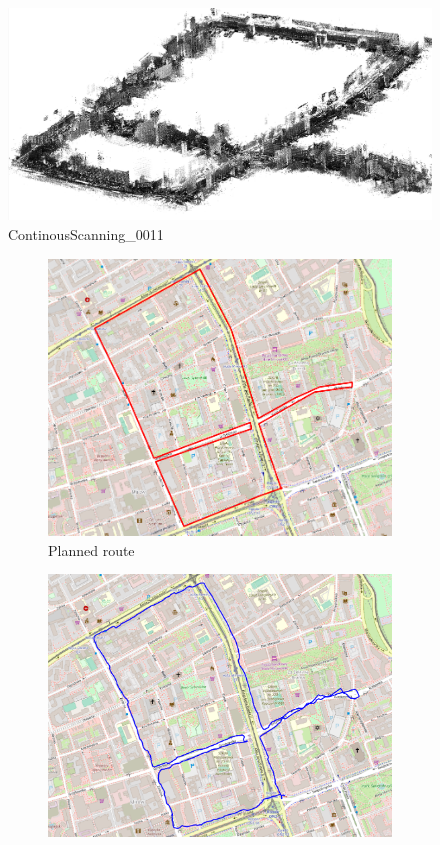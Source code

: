 \documentclass[a4paper,12pt]{book}
\begin{document}
\begin{enumerate}
	\begin{figure}[H]
		\includegraphics[width=1\linewidth]{cloud11}
		\caption{ContinousScanning\_0011}
	\end{figure}
	\begin{figure}[H]
		\centering
		\begin{subfigure}{.88\textwidth}
			\centering
			\includegraphics[width=1\linewidth]{route_p11}
			\caption{Planned route}
			\label{fig:a11}
		\end{subfigure}%
		\linebreak
		\begin{subfigure}{.88\textwidth}
			\centering
			\includegraphics[width=1\linewidth]{route_c11}

\end{subfigure}
\end{figure}
\end{enumerate}
\end{document}

